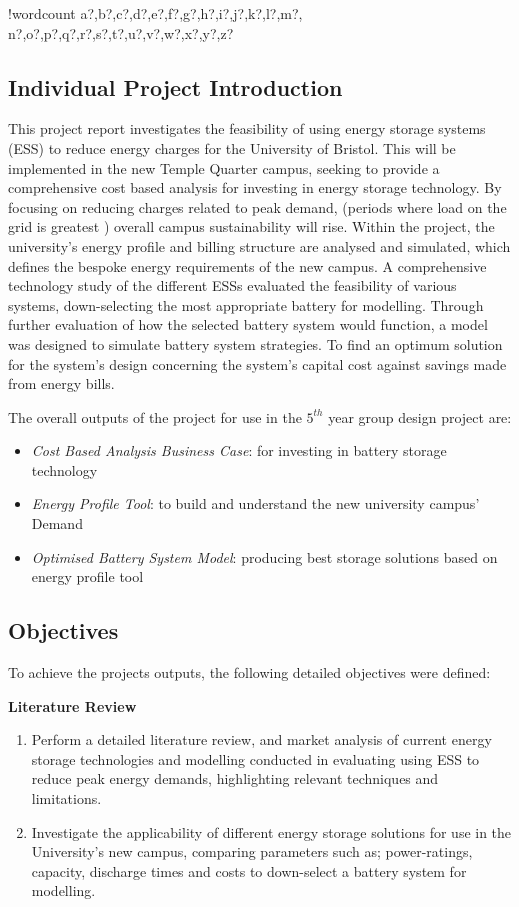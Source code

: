 \documentclass[fontsize=9.5pt]{extarticle}
\numberwithin{figure}{section} %
\providecommand{\tightlist}{%
  \setlength{\itemsep}{0pt}\setlength{\parskip}{0pt}}
\newcounter{words}
\newenvironment{counted}{%
  \setcounter{words}{0}
  \SearchList!{wordcount}{\stepcounter{words}}
    {a?,b?,c?,d?,e?,f?,g?,h?,i?,j?,k?,l?,m?,
    n?,o?,p?,q?,r?,s?,t?,u?,v?,w?,x?,y?,z?}
  \UndoBoundary{'}
  \SearchOrder{p;}}{%
  \StopSearching}
\begin{document}
\begin{counted}
\subsection{Individual Project
Introduction}\label{individual-project-introduction}

This project report investigates the feasibility of using energy storage
systems (ESS) to reduce energy charges for the University of Bristol.
This will be implemented in the new Temple Quarter campus, seeking to
provide a comprehensive cost based analysis for investing in energy
storage technology. By focusing on reducing charges related to peak
demand, (periods where load on the grid is greatest
\cite{WhatisPe67:online}) overall campus sustainability will rise.
Within the project, the university's energy profile and billing
structure are analysed and simulated, which defines the bespoke energy
requirements of the new campus. A comprehensive technology study of the
different ESSs evaluated the feasibility of various systems,
down-selecting the most appropriate battery for modelling. Through
further evaluation of how the selected battery system would function, a
model was designed to simulate battery system strategies. To find an
optimum solution for the system's design concerning the system's capital
cost against savings made from energy bills.

The overall outputs of the project for use in the \(5^{th}\) year group
design project are:

\begin{itemize}
\tightlist
\item
  \emph{Cost Based Analysis Business Case}: for investing in battery
  storage technology
\item
  \emph{Energy Profile Tool}: to build and understand the new university
  campus' Demand
\item
  \emph{Optimised Battery System Model}: producing best storage
  solutions based on energy profile tool
\end{itemize}

\subsection{Objectives}\label{objectives}

To achieve the projects outputs, the following detailed objectives were
defined:

\textbf{Literature Review}

\begin{enumerate}
\item Perform a detailed literature review, and market analysis of current energy storage technologies and modelling conducted in evaluating using ESS to reduce peak energy demands, highlighting relevant techniques and limitations.
\item Investigate the applicability of different energy storage solutions for use in the University's new campus, comparing parameters such as; power-ratings, capacity, discharge times and costs to down-select a battery system for modelling.
\end{enumerate}


\end{counted}
\end{document}

